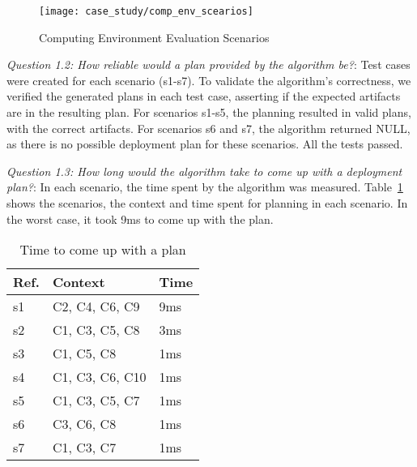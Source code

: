 \begin{figure}[!htb]
 \centering
 \texttt{[image: case\_study/comp\_env\_scearios]}
 \caption{Computing Environment Evaluation Scenarios}
\label{fig:variability_scenarios}
\end{figure}


\emph{Question 1.2:  How reliable would a plan provided
by the algorithm be?}: Test cases were created for each scenario (s1-s7).
To validate the algorithm’s correctness,
we verified the generated plans in each test case, asserting if the expected artifacts are in the resulting plan.
For scenarios s1-s5, the planning resulted in valid plans, with the correct artifacts. For scenarios s6 and s7, the algorithm returned NULL, as there is no possible deployment plan for these scenarios. All the tests passed.

\emph{Question 1.3: How long would the algorithm take to come up with a deployment plan?}: In each scenario, the time spent by the algorithm was measured. Table~\ref{table:planning_time} shows the scenarios, the context and time spent for planning in each scenario. In the worst case, it took 9ms to come up with the plan.

\begin{table}[!htb]
\centering
\caption{Time to come up with a plan}
\begin{tabular}{|p{0.5cm}|p{3.75cm}|p{0.75cm}|}
\hline
  Ref. &
  Context &
  Time \\ \hline

s1 &
C2, C4, C6, C9 &
9ms \\ \hline
s2 &
C1, C3, C5, C8 &
3ms \\ \hline
s3 &
C1, C5, C8 &
1ms \\ \hline
s4 &
C1, C3, C6, C10 &
1ms \\ \hline
s5 &
C1, C3, C5, C7 &
1ms \\ \hline
s6 &
C3, C6, C8 &
1ms \\ \hline
s7 &
C1, C3, C7  &
1ms \\ \hline

\end{tabular}
\label{table:planning_time}
\end{table}


